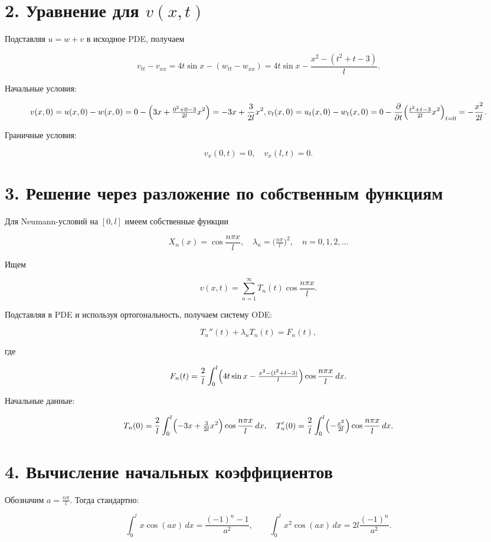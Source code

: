 \documentclass[a4paper,12pt]{article}
\begin{document}
\section*{2. Уравнение для $v(x,t)$} Подставляя $u=w+v$ в исходное PDE, получаем

$$
  v_{tt}-v_{xx}=4t\sin x - (w_{tt}-w_{xx})
  =4t\sin x - \frac{x^2-(t^2+t-3)}{l}.
$$

Начальные условия:

$$
  v(x,0)=u(x,0)-w(x,0)=0-\Bigl(3x+\tfrac{0^2+0-3}{2l}x^2\Bigr)
    =-3x+\frac{3}{2l}x^2,
  \\
  v_t(x,0)=u_t(x,0)-w_t(x,0)=0-\frac{\partial}{\partial t}\Bigl(\tfrac{t^2+t-3}{2l}x^2\Bigr)_{t=0}
    =-\frac{x^2}{2l}.
$$

Граничные условия:

$$
  v_x(0,t)=0,
  \quad v_x(l,t)=0.
$$

\section*{3. Решение через разложение по собственным функциям} Для Neumann-условий на $[0,l]$ имеем собственные функции

$$
  X_n(x)=\cos\frac{n\pi x}{l},
  \quad \lambda_n=\bigl(\tfrac{n\pi}{l}\bigr)^2,
  \quad n=0,1,2,\dots
$$

Ищем

$$
  v(x,t)=\sum_{n=1}^\infty T_n(t)\cos\frac{n\pi x}{l}.
$$

Подставляя в PDE и используя ортогональность, получаем систему ODE:

$$
  T_n''(t)+\lambda_nT_n(t)=F_n(t),
$$

где

$$
  F_n(t)=\frac{2}{l}\int_0^l
    \Bigl(4t\sin x - \tfrac{x^2-(t^2+t-3)}{l}\Bigr)
    \cos\frac{n\pi x}{l}\,dx.
$$

Начальные данные:

$$
  T_n(0)=\frac{2}{l}\int_0^l
    \Bigl(-3x+\tfrac{3}{2l}x^2\Bigr)
    \cos\frac{n\pi x}{l}\,dx,
  \quad
  T_n'(0)=\frac{2}{l}\int_0^l\Bigl(-\tfrac{x^2}{2l}\Bigr)\cos\frac{n\pi x}{l}\,dx.
$$

\section*{4. Вычисление начальных коэффициентов} Обозначим $a=\frac{n\pi}{l}$. Тогда стандартно:

$$
  \int_0^l x\cos(ax)\,dx=\frac{(-1)^n-1}{a^2},
  \qquad
  \int_0^l x^2\cos(ax)\,dx=2l\frac{(-1)^n}{a^2}.
$$
\end{document}
